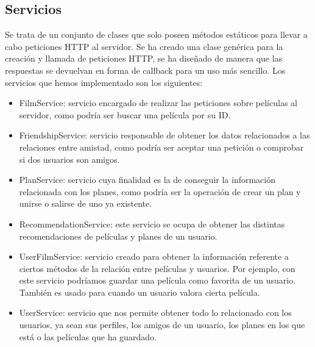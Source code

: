 \subsection{Servicios}
\label{makereference4.3.6}
Se trata de un conjunto de clases que solo poseen métodos estáticos para llevar a cabo peticiones HTTP al servidor. Se ha creado una clase genérica para la creación y llamada de peticiones HTTP, se ha diseñado de manera que las respuestas se devuelvan en forma de callback para un uso más sencillo.
Los servicios que hemos implementado son los siguientes:
\begin{itemize}
    \item FilmService: servicio encargado de realizar las peticiones sobre películas al servidor, como podría ser buscar una película por su ID.
    \item FriendshipService: servicio responsable de obtener los datos relacionados a las relaciones entre amistad, como podría ser aceptar una petición o comprobar si dos usuarios son amigos.
    \item PlanService: servicio cuya finalidad es la de conseguir la información relacionada con los planes, como podría ser la operación de crear un plan y unirse o salirse de uno ya existente.
    \item RecommendationService: este servicio se ocupa de obtener las distintas recomendaciones de películas y planes de un usuario.
    \item UserFilmService: servicio creado para obtener la información referente a ciertos métodos de la relación entre películas y usuarios. Por ejemplo, con este servicio podríamos guardar una película como favorita de un usuario. También es usado para cuando un usuario valora cierta película.
    \item UserService: servicio que nos permite obtener todo lo relacionado con los usuarios, ya sean sus perfiles, los amigos de un usuario, los planes en los que está o las películas que ha guardado.
\end{itemize}


